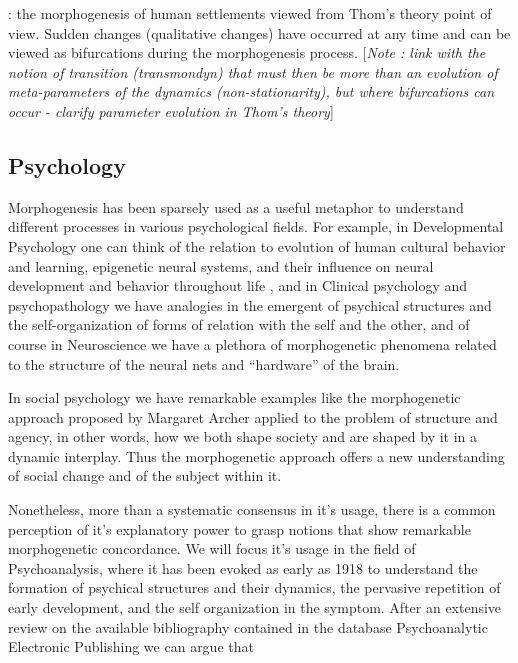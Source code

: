 \documentclass{article}
\begin{document}
\cite{renfrew1978trajectory} : the morphogenesis of human settlements viewed from Thom's theory point of view. Sudden changes (qualitative changes) have occurred at any time and can be viewed as bifurcations during the morphogenesis process. [\textit{Note : link with the notion of transition (transmondyn) that must then be more than an evolution of meta-parameters of the dynamics (non-stationarity), but where bifurcations can occur - clarify parameter evolution in Thom's theory}]




\subsection{Psychology}

Morphogenesis has been sparsely used as a useful metaphor to understand different processes in various psychological fields. For example, in Developmental Psychology one can think of the relation to evolution of human cultural behavior and learning, epigenetic neural systems, and their influence on neural development and behavior throughout life , and in Clinical psychology and psychopathology we have analogies in the emergent of psychical structures and the self-organization of forms of relation with the self and the other, and of course in Neuroscience we have a plethora of morphogenetic phenomena related to  the structure of the neural nets and “hardware” of the brain.

In social psychology we have remarkable examples like the morphogenetic approach proposed by Margaret Archer applied to the problem of structure and agency, in other words, how we both shape society and are shaped by it in a dynamic interplay. Thus the morphogenetic approach offers a new understanding of social change and of the subject within it.  

Nonetheless, more than a systematic consensus in it’s usage, there is a common perception of it’s explanatory power to grasp notions that show remarkable morphogenetic concordance. 
We will focus it’s usage in the field of Psychoanalysis, where it has been evoked as early as 1918 to understand the formation of psychical structures and their dynamics, the pervasive repetition of early development, and the self organization in the symptom. After an extensive review on the available bibliography contained in the database Psychoanalytic Electronic Publishing we can argue that 




\end{document}
